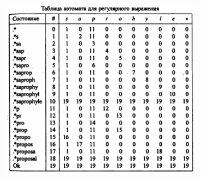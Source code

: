 \documentclass[discrete.tex]{subfiles}
\begin{document}
  \begin{figure}[H]
          \includegraphics[width=10cm]{pics/59_7}
          \centering
  \end{figure}
\end{document}
